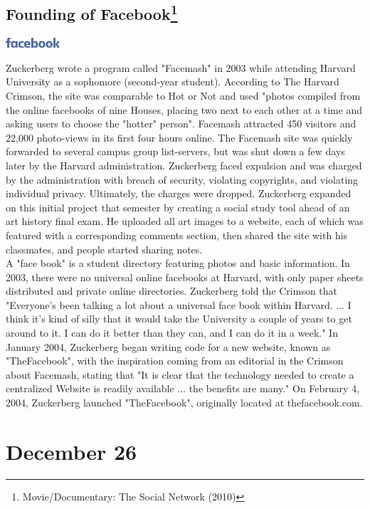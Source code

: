 \documentclass[11pt]{report}
\begin{document}
\subsection{Founding of Facebook\protect\footnote{Movie/Documentary: The Social Network (2010)}}
\vspace{2mm}\begin{center}\includegraphics[width=2cm]{./img/facebookLogo.jpg}\end{center}
Zuckerberg wrote a program called "Facemash" in 2003 while attending Harvard University as a sophomore (second-year student). According to The Harvard Crimson, the site was comparable to Hot or Not and used "photos compiled from the online facebooks of nine Houses, placing two next to each other at a time and asking users to choose the "hotter" person". Facemash attracted 450 visitors and 22,000 photo-views in its first four hours online. The Facemash site was quickly forwarded to several campus group list-servers, but was shut down a few days later by the Harvard administration. Zuckerberg faced expulsion and was charged by the administration with breach of security, violating copyrights, and violating individual privacy. Ultimately, the charges were dropped. Zuckerberg expanded on this initial project that semester by creating a social study tool ahead of an art history final exam. He uploaded all art images to a website, each of which was featured with a corresponding comments section, then shared the site with his classmates, and people started sharing notes.\\
A "face book" is a student directory featuring photos and basic information. In 2003, there were no universal online facebooks at Harvard, with only paper sheets distributed and private online directories. Zuckerberg told the Crimson that "Everyone's been talking a lot about a universal face book within Harvard. ... I think it's kind of silly that it would take the University a couple of years to get around to it. I can do it better than they can, and I can do it in a week." In January 2004, Zuckerberg began writing code for a new website, known as "TheFacebook", with the inspiration coming from an editorial in the Crimson about Facemash, stating that "It is clear that the technology needed to create a centralized Website is readily available ... the benefits are many." On February 4, 2004, Zuckerberg launched "TheFacebook", originally located at thefacebook.com.
\section{December 26}
\end{document}
